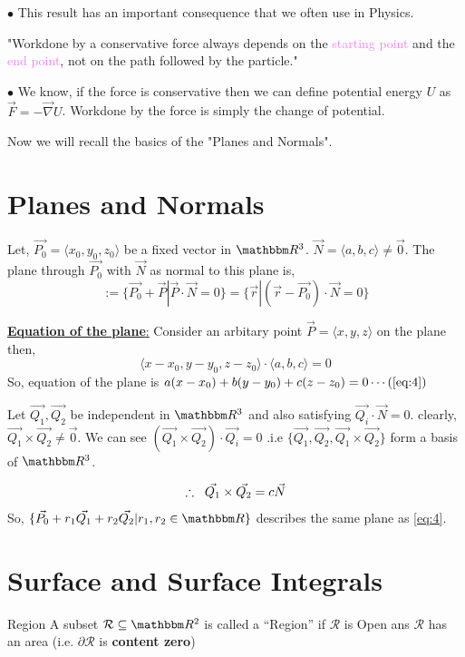 \documentclass[../Analysis-3]{subfiles}
\begin{document}
$\bullet$ This result has an important consequence that we often use in Physics.

"Workdone by a conservative force always depends on the \textcolor{violet}{starting point} and the \textcolor{violet}{end point}, not on the path followed by the particle."
\vspace*{0.2cm}

$\bullet$ We know, if the force is conservative then we can define potential energy $U$ as $ \vec{F} = -\vec{\nabla }U$. Workdone by the force is simply the change of potential.

\vspace*{0.2cm}

Now we will recall the basics of the "Planes and Normals".

\vspace*{0.2cm}

\section{Planes and Normals}
Let, $\vec{P_0} = \langle x_0,y_0,z_0 \rangle$ be a fixed vector in $\R^3$. $\vec{N} = \langle a,b,c \rangle \neq \vec{0}$. The plane through $\vec{P_0}$ with $\vec{N}$ as normal to this plane is,
$$ := \{\vec{P_0} + \vec{P} | \vec{P}\cdot \vec{N} = 0\} = \{\vec{r} | (\vec{r}-\vec{P_0})\cdot \vec{N} = 0 \} $$

\underline{\textbf{Equation of the plane}:} Consider an  arbitary point $\vec{P} = \langle x,y,z\rangle$ on the plane then, $$\langle x-x_0,y-y_0,z-z_0\rangle \cdot \langle a,b,c \rangle = 0$$
So, equation of the plane is $a(x-x_0)+b(y-y_0) +c(z-z_0)= 0 \cdots \label{eq:4} (\ref{eq:4})$

\vspace{1cm}

Let $\vec{Q_1},\vec{Q_2}$ be independent in $\R^3$ and also satisfying $\vec{Q_i} \cdot \vec{N} = 0$. clearly, $\vec{Q_1}\times \vec{Q_2} \neq \vec{0}$. We can see $(\vec{Q_1}\times \vec{Q_2}) \cdot \vec{Q_i} = 0$ .i.e $\{\vec{Q_1},\vec{Q_2},\vec{Q_1}\times \vec{Q_2}\}$ form a basis of $\R^3$.

$$\therefore \hspace{0.2cm}\vec{Q_1}\times \vec{Q_2} = c \vec{N}$$
So, $\{\vec{P_0} + r_1 \vec{Q_1} + r_2 \vec{Q_2} | r_1,r_2 \in \R \}$ describes the same plane as \ref{eq:4}.

\section{Surface and Surface Integrals}
\begin{Def}{Region}{}
    A subset $\mathcal{R} \subseteq \R^2$ is called a \enquote{Region} if $\mathcal{R}$ is Open ans $\mathcal{R}$ has an area (i.e. $\partial \mathcal{R}$ is \textbf{content zero})
\end{Def}
\end{document}
